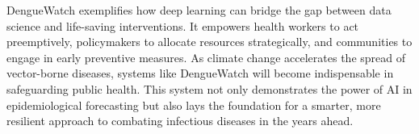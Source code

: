 DengueWatch exemplifies how deep learning can bridge the gap between data science and life-saving interventions. It empowers health workers to act preemptively, policymakers to allocate resources strategically, and communities to engage in early preventive measures. As climate change accelerates the spread of vector-borne diseases, systems like DengueWatch will become indispensable in safeguarding public health. This system not only demonstrates the power of AI in epidemiological forecasting but also lays the foundation for a smarter, more resilient approach to combating infectious diseases in the years ahead.
